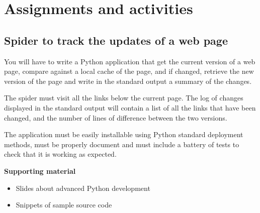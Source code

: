 \documentclass[a4paper]{article}
\begin{document}
\section{Assignments and activities}

\subsection{Spider to track the updates of a web page}
\label{sub:python}

You will have to write a Python application that get the current
version of a web page, compare against a local cache of the page, and
if changed, retrieve the new version of the page and write in the
standard output a summary of the changes.

The spider must visit all the links below the current page. The log of
changes displayed in the standard output will contain a list of all
the links that have been changed, and the number of lines of
difference between the two versions.

The application must be easily installable using Python standard
deployment methods, must be properly document and must include a
battery of tests to check that it is working as expected.

\textbf{Supporting material}

\begin{itemize}
\item Slides about advanced Python development
\item Snippets of sample source code
\end{itemize}


\end{document}
